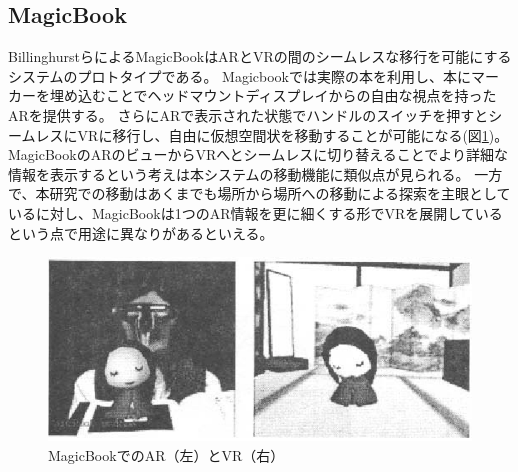 \subsection{MagicBook}
BillinghurstらによるMagicBook\cite{10.1145/634067.634087}はARとVRの間のシームレスな移行を可能にするシステムのプロトタイプである。
Magicbookでは実際の本を利用し、本にマーカーを埋め込むことでヘッドマウントディスプレイからの自由な視点を持ったARを提供する。
さらにARで表示された状態でハンドルのスイッチを押すとシームレスにVRに移行し、自由に仮想空間状を移動することが可能になる(図\ref{fig:MagicBook})。
MagicBookのARのビューからVRへとシームレスに切り替えることでより詳細な情報を表示するという考えは本システムの移動機能に類似点が見られる。
一方で、本研究での移動はあくまでも場所から場所への移動による探索を主眼としているに対し、MagicBookは1つのAR情報を更に細くする形でVRを展開しているという点で用途に異なりがあるといえる。


\begin{figure}[h]
  \centering 
  \includegraphics[width=120mm]{images/MagicBook.png}
  \caption{MagicBookでのAR（左）とVR（右）} \label{fig:MagicBook}
\end{figure}


